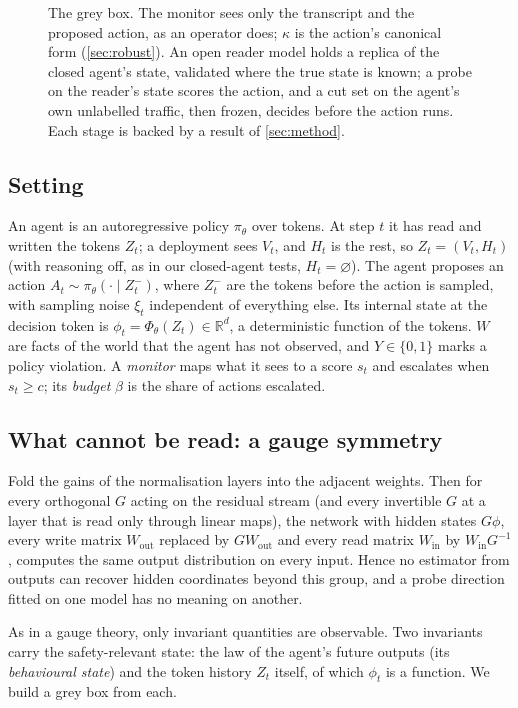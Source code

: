 \begin{figure}[t]
\caption{The grey box. The monitor sees only the transcript and the proposed action, as an operator does; $\kappa$ is the action's canonical form (\cref{sec:robust}). An open reader model holds a replica of the closed agent's state, validated where the true state is known; a probe on the reader's state scores the action, and a cut set on the agent's own unlabelled traffic, then frozen, decides before the action runs. Each stage is backed by a result of \cref{sec:method}.}
\label{fig:method}
\end{figure}

\subsection{Setting}
An agent is an autoregressive policy $\pi_\theta$ over tokens. At step $t$ it has read and written the tokens $Z_t$; a deployment sees $V_t$, and $H_t$ is the rest, so $Z_t=(V_t,H_t)$ (with reasoning off, as in our closed-agent tests, $H_t=\varnothing$). The agent proposes an action $A_t\sim\pi_\theta(\cdot\mid Z^-_t)$, where $Z^-_t$ are the tokens before the action is sampled, with sampling noise $\xi_t$ independent of everything else. Its internal state at the decision token is $\phi_t=\Phi_\theta(Z_t)\in\mathbb{R}^d$, a deterministic function of the tokens. $W$ are facts of the world that the agent has not observed, and $Y\in\{0,1\}$ marks a policy violation. A \emph{monitor} maps what it sees to a score $s_t$ and escalates when $s_t\ge c$; its \emph{budget} $\beta$ is the share of actions escalated.

\subsection{What cannot be read: a gauge symmetry}
\begin{proposition}[gauge]\label{prop:gauge}
Fold the gains of the normalisation layers into the adjacent weights. Then for every orthogonal $G$ acting on the residual stream (and every invertible $G$ at a layer that is read only through linear maps), the network with hidden states $G\phi$, every write matrix $W_{\mathrm{out}}$ replaced by $GW_{\mathrm{out}}$ and every read matrix $W_{\mathrm{in}}$ by $W_{\mathrm{in}}G^{-1}$, computes the same output distribution on every input.
Hence no estimator from outputs can recover hidden coordinates beyond this group, and a probe direction fitted on one model has no meaning on another.
\end{proposition}
As in a gauge theory, only invariant quantities are observable. Two invariants carry the safety-relevant state: the law of the agent's future outputs (its \emph{behavioural state}) and the token history $Z_t$ itself, of which $\phi_t$ is a function. We build a grey box from each.


